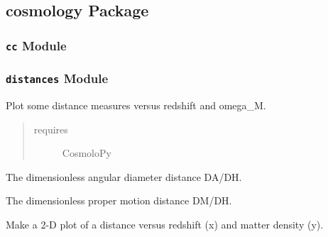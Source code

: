 \documentclass[letterpaper,10pt,english]{sphinxmanual}
\begin{document}
\subsection{cosmology Package}
\label{SamPy.cosmology:cosmology-package}\label{SamPy.cosmology::doc}

\subsubsection{\texttt{cc} Module}
\label{SamPy.cosmology:cc-module}\label{SamPy.cosmology:module-SamPy.cosmology.cc}

\subsubsection{\texttt{distances} Module}
\label{SamPy.cosmology:distances-module}\label{SamPy.cosmology:module-SamPy.cosmology.distances}
Plot some distance measures versus redshift and omega\_M.
\begin{quote}\begin{description}
\item[{requires}] \leavevmode
CosmoloPy

\end{description}\end{quote}


\begin{fulllineitems}
\label{SamPy.cosmology:SamPy.cosmology.distances.plot_DA}
The dimensionless angular diameter distance DA/DH.

\end{fulllineitems}



\begin{fulllineitems}
\label{SamPy.cosmology:SamPy.cosmology.distances.plot_DM}
The dimensionless proper motion distance DM/DH.

\end{fulllineitems}



\begin{fulllineitems}
\label{SamPy.cosmology:SamPy.cosmology.distances.plot_dist}
Make a 2-D plot of a distance versus redshift (x) and matter density (y).

\end{fulllineitems}
\end{document}
